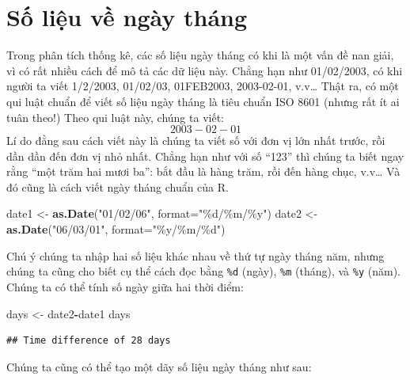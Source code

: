 \documentclass[
]{book}
\newenvironment{Shaded}{\begin{snugshade}}{\end{snugshade}}
\newcommand{\DataTypeTok}[1]{\textcolor[rgb]{0.13,0.29,0.53}{#1}}
\newcommand{\KeywordTok}[1]{\textcolor[rgb]{0.13,0.29,0.53}{\textbf{#1}}}
\newcommand{\NormalTok}[1]{#1}
\newcommand{\OperatorTok}[1]{\textcolor[rgb]{0.81,0.36,0.00}{\textbf{#1}}}
\newcommand{\StringTok}[1]{\textcolor[rgb]{0.31,0.60,0.02}{#1}}
\begin{document}
\hypertarget{sux1ed1-liux1ec7u-vux1ec1-nguxe0y-thuxe1ng}{%
\section{Số liệu về ngày tháng}\label{sux1ed1-liux1ec7u-vux1ec1-nguxe0y-thuxe1ng}}

Trong phân tích thống kê, các số liệu ngày tháng có khi là một vấn đề nan giải, vì có rất nhiều cách để mô tả các dữ liệu này. Chẳng hạn như 01/02/2003, có khi người ta viết 1/2/2003, 01/02/03, 01FEB2003, 2003-02-01, v.v\ldots{} Thật ra, có một qui luật chuẩn để viết số liệu ngày tháng là tiêu chuẩn ISO 8601 (nhưng rất ít ai tuân theo!) Theo qui luật này, chúng ta viết:
\[2003-02-01\]
Lí do đằng sau cách viết này là chúng ta viết số với đơn vị lớn nhất trước, rồi dần dần đến đơn vị nhỏ nhất. Chẳng hạn như với số ``123'' thì chúng ta biết ngay rằng ``một trăm hai mươi ba'': bắt đầu là hàng trăm, rồi đến hàng chục, v.v\ldots{} Và đó cũng là cách viết ngày tháng chuẩn của R.

\begin{Shaded}
\begin{Highlighting}[]
\NormalTok{date1 \textless{}{-}}\StringTok{ }\KeywordTok{as.Date}\NormalTok{(}\StringTok{"01/02/06"}\NormalTok{, }\DataTypeTok{format=}\StringTok{"\%d/\%m/\%y"}\NormalTok{)}
\NormalTok{date2 \textless{}{-}}\StringTok{ }\KeywordTok{as.Date}\NormalTok{(}\StringTok{"06/03/01"}\NormalTok{, }\DataTypeTok{format=}\StringTok{"\%y/\%m/\%d"}\NormalTok{)}
\end{Highlighting}
\end{Shaded}

Chú ý chúng ta nhập hai số liệu khác nhau về thứ tự ngày tháng năm, nhưng chúng ta cũng cho biết cụ thể cách đọc bằng \texttt{\%d} (ngày), \texttt{\%m} (tháng), và \texttt{\%y} (năm). Chúng ta có thể tính số ngày giữa hai thời điểm:

\begin{Shaded}
\begin{Highlighting}[]
\NormalTok{days \textless{}{-}}\StringTok{ }\NormalTok{date2}\OperatorTok{{-}}\NormalTok{date1}
\NormalTok{days}
\end{Highlighting}
\end{Shaded}

\begin{verbatim}
## Time difference of 28 days
\end{verbatim}

Chúng ta cũng có thể tạo một dãy số liệu ngày tháng như sau:
\end{document}
